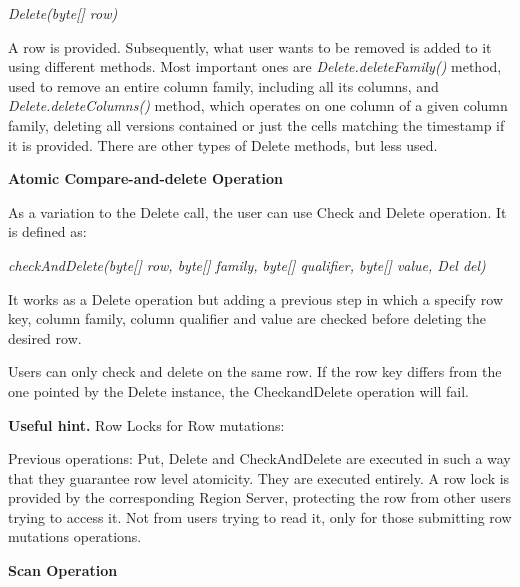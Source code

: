 \par
\bigskip
\centerline{\textit{Delete(byte[] row)}}
\bigskip

A row is provided. Subsequently, what user wants to be removed is added to it using different methods. Most important ones are \textit{Delete.deleteFamily()} method, used to remove an entire column family, including all its columns, and \textit{Delete.deleteColumns()} method, which operates on one column of a given column family, deleting all versions contained or just the cells matching the timestamp if it is provided. There are other types of Delete methods, but less used.

\bigskip
\textbf{Atomic Compare-and-delete Operation}

As a variation to the Delete call, the user can use Check and Delete operation. It is defined as:

\par
\bigskip
\centerline{\textit{checkAndDelete(byte[] row, byte[] family, byte[] qualifier, byte[] value, Del del)}}
\bigskip

It works as a Delete operation but adding a previous step in which a specify row key, column family, column qualifier and value are checked before deleting the desired row.
\par
Users can only check and delete on the same row. If the row key differs from the one pointed by the Delete instance, the CheckandDelete operation will fail.

\par
\textbf{Useful hint. }Row Locks for Row mutations:

Previous operations: Put, Delete and CheckAndDelete are executed in such a way that they guarantee row level atomicity. They are executed entirely. A row lock is provided by the corresponding Region Server, protecting the row from other users trying to access it. Not from users trying to read it, only for those submitting row mutations operations.

\bigskip
\textbf{Scan Operation}

